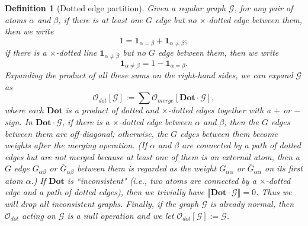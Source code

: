 \documentclass{article}
\newcommand{\1}{\mathds{1}}
\numberwithin{equation}{section}
\newcommand{\al}{\alpha}
\newcommand{\be}{\begin{equation}}
\newcommand{\ee}{\end{equation}}
\renewcommand{\Dot}{\mathbf {Dot}}
\renewcommand{\cal}{\mathcal}
\theoremstyle{plain} %
\newtheorem{definition}[theorem]{Definition}
\theoremstyle{remark}
\begin{document}
\begin{definition}[Dotted edge partition] \label{dot-def}
 Given a regular graph $\cal G$, for any pair of atoms $\al$ and $\beta$, if there is at least one $G$ edge but no $\times$-dotted edge between them, then we write 
 $$1=\mathbf 1_{\al=\beta} + \mathbf 1_{\al \ne \beta} ;$$
  if there is a $\times$-dotted line $ \mathbf 1_{\al\ne \beta}$ but no $G$ edge between them, then we write 
 $$\mathbf 1_{\al\ne \beta} =1 - \mathbf 1_{\al = \beta}.$$
 Expanding the product of all these sums on the right-hand sides, we can expand $\cal G$ as
 \be\label{odot}\cal O_{dot}[\cal G] := \sum \cal O_{merge}[{\Dot} \cdot \cal G],\ee
 where each ${\Dot}$ is a product of dotted and $\times$-dotted edges together with a $+$ or $-$ sign. %
  In ${\Dot} \cdot \cal G$, if there is a $\times$-dotted edge between $\al$ and $\beta$, then the $G$ edges between them are off-diagonal; otherwise, the $G$ edges between them become weights after the merging operation. (If $\al$ and $\beta$ are connected by a path of dotted edges but are not merged because at least one of them is an external atom, then a $G$ edge $G_{\al\beta}$ or $\overline G_{\al\beta}$ between them is regarded as the weight $G_{\al\al}$ or $\overline G_{\al\al}$ on its first atom $\al$.) If $\Dot$ is ``inconsistent" (i.e., two atoms are connected by a  $\times$-dotted edge and a path of dotted edges), then we trivially have $\llbracket \Dot \cdot \cal G\rrbracket=0$. Thus we will drop all inconsistent graphs.  Finally, if the graph $\cal G$ is already normal, then $\cal O_{dot}$ acting on $\cal G$ is a null operation and we let $\cal O_{dot}[\cal G]:=\cal G$.
  

  
 
 

\end{definition}
\end{document}
